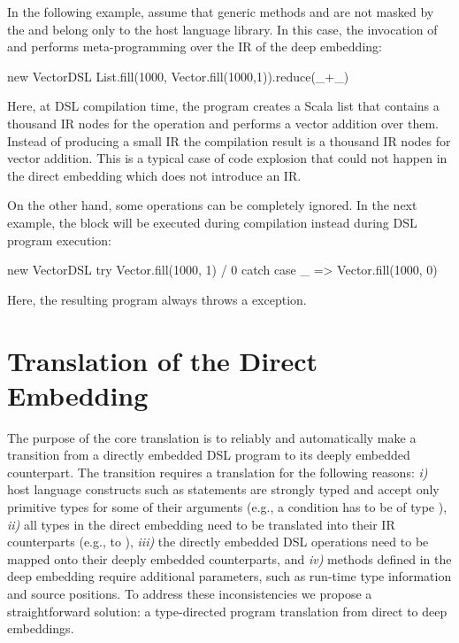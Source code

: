 In the following example, assume that generic methods  and
 are not masked by the  and belong only to the host
language library. In this case, the invocation of  and 
performs meta-programming over the IR of the deep embedding:\vspace{3pt}

\begin{listingtiny}
  new VectorDSL {
    List.fill(1000, Vector.fill(1000,1)).reduce(_+_)
  }
\end{listingtiny}\vspace{3pt}

Here, at DSL compilation time, the program creates a Scala list that contains a thousand
IR nodes for the  operation and performs a vector addition over them.
Instead of producing a small IR the compilation result is a thousand IR nodes for
vector addition. This is a typical case of code explosion that could not happen
in the direct embedding which does not introduce an IR.

On the other hand, some operations can be completely ignored. In the next
example, the  block will be executed during \edsl compilation
instead during DSL program execution:\vspace{3pt}

\begin{listingtiny}
  new VectorDSL {
    try Vector.fill(1000, 1) / 0
    catch { case _ => Vector.fill(1000, 0) }
  }
\end{listingtiny}

Here, the resulting program always throws a 
exception.

\chapter{Translation of the Direct Embedding}
\label{sec:translation}

The purpose of the core \yy translation is to reliably and automatically make
a transition from a directly embedded DSL program to its deeply embedded
counterpart. The transition requires a translation for the following reasons:
\emph{i)} host language constructs such as  statements are strongly
typed and accept only primitive types for some of their arguments (e.g., a
condition has to be of type ), \emph{ii)} all types in the direct
embedding need to be translated into their IR counterparts (e.g.,  to
), \emph{iii)} the directly embedded DSL operations need to be
mapped onto their deeply embedded counterparts, and \emph{iv)} methods defined
in the deep embedding require additional parameters, such as run-time type
information and source positions. To address these inconsistencies we propose a
straightforward solution: a type-directed program translation from direct to
deep embeddings.


